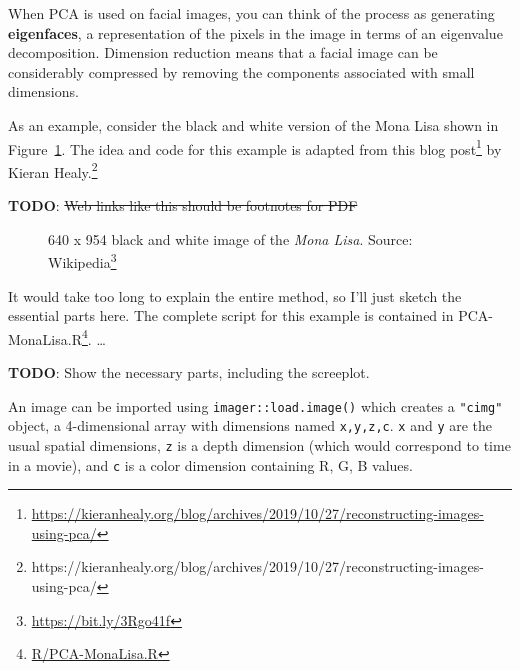 \documentclass[
  letterpaper,
  10pt,
  krantz2]{krantz}
\providecommand{\href}[2]{#2\footnote{\url{#1}}}
\begin{document}
{When PCA is used on facial images, you can think of the process as
generating \textbf{eigenfaces}, a representation of the pixels in the
image in terms of an eigenvalue decomposition. Dimension reduction means
that a facial image can be considerably compressed by removing the
components associated with small dimensions.

As an example, consider the black and white version of the Mona Lisa
shown in Figure~\ref{fig-MonaLisa}. The idea and code for this example
is adapted from this
\href{https://kieranhealy.org/blog/archives/2019/10/27/reconstructing-images-using-pca/}{blog
post} by Kieran Healy.\footnote{https://kieranhealy.org/blog/archives/2019/10/27/reconstructing-images-using-pca/}

\textbf{TODO}: \st{Web links like this should be footnotes for PDF}

\begin{figure}


\caption{\label{fig-MonaLisa}640 x 954 black and white image of the
\emph{Mona Lisa}. Source: \href{https://bit.ly/3Rgo41f}{Wikipedia}}

\end{figure}%

It would take too long to explain the entire method, so I'll just sketch
the essential parts here. The complete script for this example is
contained in \href{R/PCA-MonaLisa.R}{PCA-MonaLisa.R}. \ldots{}

\textbf{TODO}: Show the necessary parts, including the screeplot.

An image can be imported using \texttt{imager::load.image()} which
creates a \texttt{"cimg"} object, a 4-dimensional array with dimensions
named \texttt{x,y,z,c}. \texttt{x} and \texttt{y} are the usual spatial
dimensions, \texttt{z} is a depth dimension (which would correspond to
time in a movie), and \texttt{c} is a color dimension containing R, G, B
values.

}
\end{document}
